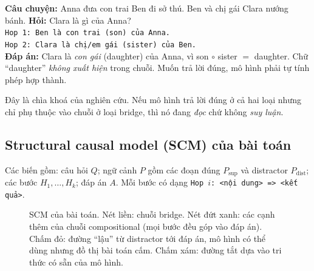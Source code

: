 \documentclass[11pt]{article}
\begin{document}
\begin{vidu}
\textbf{Câu chuyện:} Anna đưa con trai Ben đi sở thú. Ben và chị gái Clara nướng bánh.
\textbf{Hỏi:} Clara là gì của Anna?\\
\texttt{Hop 1: Ben là con trai (son) của Anna.}\\
\texttt{Hop 2: Clara là chị/em gái (sister) của Ben.}\\
\textbf{Đáp án:} Clara là \emph{con gái} (daughter) của Anna, vì son $\circ$ sister $=$ daughter.
Chữ ``daughter'' \emph{không xuất hiện} trong chuỗi. Muốn trả lời đúng, mô hình phải tự tính phép
hợp thành.
\end{vidu}

Đây là chìa khoá của nghiên cứu. Nếu mô hình trả lời đúng ở cả hai loại nhưng chỉ phụ thuộc vào
chuỗi ở loại bridge, thì nó đang \emph{đọc} chứ không \emph{suy luận}.

\subsection{Structural causal model (SCM) của bài toán}

Các biến gồm: câu hỏi $Q$; ngữ cảnh $P$ gồm các đoạn đúng $P_{\text{sup}}$ và distractor
$P_{\text{dist}}$; các bước $H_1,\dots,H_k$; đáp án $A$. Mỗi bước có dạng
\texttt{Hop $i$: <nội dung> => <kết quả>}.

\begin{figure}[h]
\centering
{}
\caption{SCM của bài toán. Nét liền: chuỗi bridge. Nét đứt xanh: các cạnh thêm của chuỗi
compositional (mọi bước đều góp vào đáp án). Chấm đỏ: đường ``lậu'' từ distractor tới đáp án,
mô hình có thể dùng nhưng đồ thị bài toán cấm. Chấm xám: đường tắt dựa vào tri thức có sẵn của
mô hình.}
\label{fig:scm}
\end{figure}
\end{document}
